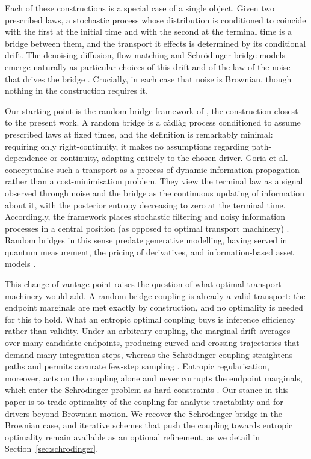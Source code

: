 \documentclass{article}
\newcommand{\cadlag}{{c\`adl\`ag }}
\newcommand{\Schrodinger}{Schr\"odinger\xspace}
\theoremstyle{definition}
\begin{document}
Each of these constructions is a special case of a single object. Given two prescribed laws, a stochastic process whose distribution is conditioned to coincide with the first at the initial time and with the second at the terminal time is a bridge between them, and the transport it effects is determined by its conditional drift. The denoising-diffusion, flow-matching and \Schrodinger-bridge models emerge naturally as particular choices of this drift and of the law of the noise that drives the bridge \cite{debortoli2021diffusion,goria_random-bridges_2025,GushchinKholkin2024,peluchetti2023diffusion,peluchetti2023first,shi2023diffusion,WangJiaoYang2021,ZhouLouKhannaErmon2024}. Crucially, in each case that noise is Brownian, though nothing in the construction requires it.

Our starting point is the random-bridge framework of \cite{goria_random-bridges_2025}, the construction closest to the present work. A random bridge is a \cadlag process conditioned to assume prescribed laws at fixed times, and the definition is remarkably minimal: requiring only right-continuity, it makes no assumptions regarding path-dependence or continuity, adapting entirely to the chosen driver. Goria et al. conceptualise such a transport as a process of dynamic information propagation rather than a cost-minimisation problem. They view the terminal law as a signal observed through noise and the bridge as the continuous updating of information about it, with the posterior entropy decreasing to zero at the terminal time. Accordingly, the framework places stochastic filtering and noisy information processes in a central position (as opposed to optimal transport machinery) \cite{hoylehughstonmacrina_2011, Menguturk_2018}. Random bridges in this sense predate generative modelling, having served in quantum measurement, the pricing of derivatives, and information-based asset models \cite{BrodyHughstonMacrina_2008, BrodyHughston_2005, BrodyHughston_2006, hoylehmacrinamenguturk_2020, Menguturk_2016, Menguturk_2018, Menguturk_2023}.

This change of vantage point raises the question of what optimal transport machinery would add. A random bridge coupling is already a valid transport: the endpoint marginals are met exactly by construction, and no optimality is needed for this to hold. What an entropic optimal coupling buys is inference efficiency rather than validity. Under an arbitrary coupling, the marginal drift averages over many candidate endpoints, producing curved and crossing trajectories that demand many integration steps, whereas the \Schrodinger coupling straightens paths and permits accurate few-step sampling \cite{shi2023diffusion}. Entropic regularisation, moreover, acts on the coupling alone and never corrupts the endpoint marginals, which enter the \Schrodinger problem as hard constraints \cite{leonard2014survey}. Our stance in this paper is to trade optimality of the coupling for analytic tractability and for drivers beyond Brownian motion. We recover the \Schrodinger bridge in the Brownian case, and iterative schemes that push the coupling towards entropic optimality remain available as an optional refinement, as we detail in Section~\ref{sec:schrodinger}.
\end{document}
